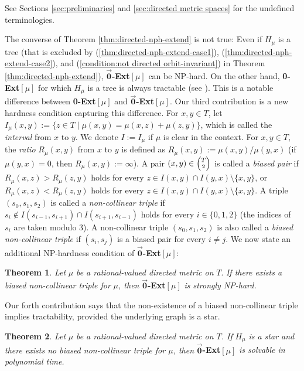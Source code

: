 \documentclass[11pt]{article}
\theoremstyle{definition}
\newtheorem{theorem}{Theorem}[section]
\begin{document}
See Sections \ref{sec:preliminaries} and \ref{sec:directed metric spaces} for the undefined terminologies.

The converse of Theorem \ref{thm:directed-nph-extend} is not true: Even if $H_\mu$ is a tree (that is excluded by (\ref{thm:directed-nph-extend-case1}), (\ref{thm:directed-nph-extend-case2}), and (\ref{condition:not directed orbit-invariant}) in Theorem \ref{thm:directed-nph-extend}), $\overrightarrow{\textbf{0}}$\textbf{-Ext}$[\mu]$ can be NP-hard. On the other hand, \textbf{0-Ext}$[\mu]$ for which $H_\mu$ is a tree is always tractable (see \cite{tansel1983}). This is a notable difference between \textbf{0-Ext}$[\mu]$ and $\overrightarrow{\textbf{0}}$\textbf{-Ext}$[\mu]$. Our third contribution is a new hardness condition capturing this difference. For $x,y\in T$, let $I_\mu(x,y):=\{z\in T\mid \mu(x,y)=\mu(x,z)+\mu(z,y)\}$, which is called the \textit{interval} from $x$ to $y$. We denote $I:=I_\mu$ if $\mu$ is clear in the context. For $x,y\in T$, the \textit{ratio} $R_{\mu}(x,y)$ from $x$ to $y$ is defined as $R_{\mu}(x,y):=\mu(x,y)/\mu(y,x)$ (if $\mu(y,x)=0$, then $R_{\mu}(x,y):=\infty$). A pair $(x,y)\in
{\scriptsize\begin{pmatrix}T \\
                     2 \\
      \end{pmatrix}}$
is called a \textit{biased pair} if $R_{\mu}(x,z)>R_{\mu}(z,y)$ holds for every $z\in I(x,y)\cap I(y,x)\setminus \{x,y\}$, or $R_{\mu}(x,z)<R_{\mu}(z,y)$ holds for every $z\in I(x,y)\cap I(y,x)\setminus \{x,y\}$. A triple $(s_0,s_1,s_2)$ is called a \textit{non-collinear triple} if $s_i\notin I(s_{i-1},s_{i+1})\cap I(s_{i+1},s_{i-1})$ holds for every $i\in \{0,1,2\}$ (the indices of $s_i$ are taken modulo 3). A non-collinear triple $(s_0,s_1,s_2)$ is also called a \textit{biased non-collinear triple} if $(s_i,s_j)$ is a biased pair for every $i\neq j$. We now state an additional NP-hardness condition of $\overrightarrow{\textbf{0}}$\textbf{-Ext}$[\mu]$:
\begin{theorem}
\label{thm:directed-nph-new}
\textit{Let} $\mu$ \textit{be a rational-valued directed metric on }$T$. \textit{If there exists a biased non-collinear triple for }$\mu$\textit{, then }$\overrightarrow{\textbf{0}}$\textbf{-Ext}$[\mu]$ \textit{is strongly NP-hard.}
\end{theorem}

Our forth contribution says that the non-existence of a biased non-collinear triple implies tractability, provided the underlying graph is a star.
\begin{theorem}
\label{thm:directed-p-star}
\textit{Let} $\mu$ \textit{be a rational-valued directed metric on $T$. If }$H_\mu$ \textit{is a star and there exists no biased non-collinear triple for $\mu$, then }$\overrightarrow{\textbf{0}}$\textbf{-Ext}$[\mu]$ \textit{is solvable in polynomial time.}
\end{theorem}
\end{document}
